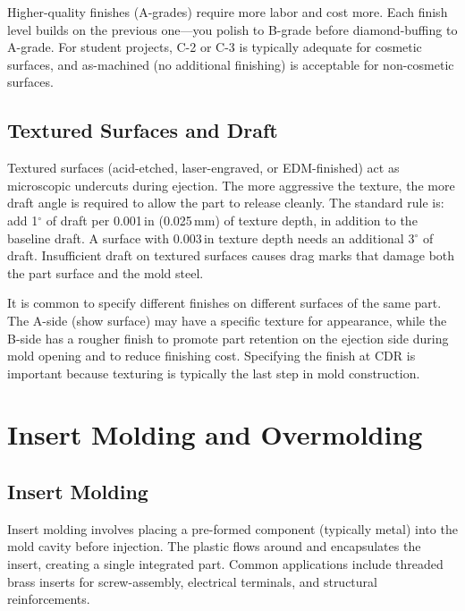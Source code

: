 \documentclass[11pt,letterpaper,twoside,openany]{book}
\providecommand{\ang}[1]{#1\ensuremath{{}^{\circ}}}
\begin{document}
Higher-quality finishes (A-grades) require more labor and cost more. Each finish level builds on the previous one---you polish to B-grade before diamond-buffing to A-grade. For student projects, C-2 or C-3 is typically adequate for cosmetic surfaces, and as-machined (no additional finishing) is acceptable for non-cosmetic surfaces.

\subsection{Textured Surfaces and Draft}
Textured surfaces (acid-etched, laser-engraved, or EDM-finished) act as microscopic undercuts during ejection. The more aggressive the texture, the more draft angle is required to allow the part to release cleanly. The standard rule is: add \ang{1} of draft per 0.001\,in (0.025\,mm) of texture depth, in addition to the baseline draft. A surface with 0.003\,in texture depth needs an additional \ang{3} of draft. Insufficient draft on textured surfaces causes drag marks that damage both the part surface and the mold steel.

\begin{tipbox}
It is common to specify different finishes on different surfaces of the same part. The A-side (show surface) may have a specific texture for appearance, while the B-side has a rougher finish to promote part retention on the ejection side during mold opening and to reduce finishing cost. Specifying the finish at CDR is important because texturing is typically the last step in mold construction.
\end{tipbox}

\FloatBarrier
\section{Insert Molding and Overmolding}
\label{sec:overmold}

\subsection{Insert Molding}
Insert molding involves placing a pre-formed component (typically metal) into the mold cavity before injection. The plastic flows around and encapsulates the insert, creating a single integrated part. Common applications include threaded brass inserts for screw-assembly, electrical terminals, and structural reinforcements.
\end{document}
